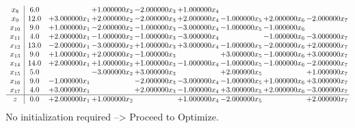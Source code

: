 \documentclass[10pt]{article}
\begin{document}
\[\begin{array}{c| c c@{\hskip 2pt} c@{\hskip 2pt} c@{\hskip 2pt} c@{\hskip 2pt} c@{\hskip 2pt} c@{\hskip 2pt} c@{\hskip 2pt} }
 x_{8}   &  6.0  &   & + 1.000000 x_{2} & -2.000000 x_{3} & + 1.000000 x_{4} &    &    &   \\
 x_{9}   &  12.0 & + 3.000000 x_{1} & + 2.000000 x_{2} & -2.000000 x_{3} & + 2.000000 x_{4} & -1.000000 x_{5} & + 2.000000 x_{6} & -2.000000 x_{7}\\
 x_{10}   &  9.0 & + 1.000000 x_{1} & -2.000000 x_{2} & -1.000000 x_{3} & -3.000000 x_{4} & -1.000000 x_{5} & -1.000000 x_{6} &   \\
 x_{11}   &  4.0 & + 2.000000 x_{1} & -1.000000 x_{2} & -1.000000 x_{3} & -3.000000 x_{4} &   & -1.000000 x_{6} & -3.000000 x_{7}\\
 x_{12}   &  13.0 & -2.000000 x_{1} & -3.000000 x_{2} & + 1.000000 x_{3} & + 3.000000 x_{4} & -1.000000 x_{5} & -2.000000 x_{6} & + 2.000000 x_{7}\\
 x_{13}   &  9.0 & + 1.000000 x_{1} & + 2.000000 x_{2} & -1.000000 x_{3} &   & + 3.000000 x_{5} & -1.000000 x_{6} & + 3.000000 x_{7}\\
 x_{14}   &  14.0 & + 2.000000 x_{1} & + 1.000000 x_{2} & + 1.000000 x_{3} & -1.000000 x_{4} & -1.000000 x_{5} & -1.000000 x_{6} & -2.000000 x_{7}\\
 x_{15}   &  5.0  &   & -3.000000 x_{2} & + 3.000000 x_{3} &   & + 2.000000 x_{5} &   & + 1.000000 x_{7}\\
 x_{16}   &  9.0 & -1.000000 x_{1} &   & -2.000000 x_{3} & -3.000000 x_{4} & -1.000000 x_{5} & + 1.000000 x_{6} & + 3.000000 x_{7}\\
 x_{17}   &  4.0 & + 3.000000 x_{1} &   & + 2.000000 x_{3} & -1.000000 x_{4} & + 3.000000 x_{5} & + 2.000000 x_{6} & -3.000000 x_{7}\\
\hline
z    &  0.0 & + 2.000000 x_{1} & + 1.000000 x_{2} &   & + 1.000000 x_{4} & -2.000000 x_{5} &   & + 2.000000 x_{7}\\
\end{array}\]
No initialization required --> Proceed to Optimize. 
\end{document}
